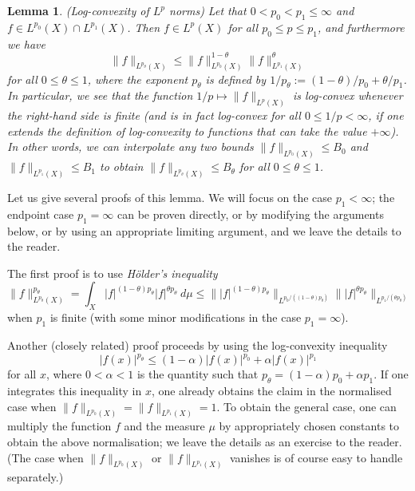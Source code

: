 \documentclass[10pt,reqno]{amsart}
\newtheorem{lemma}[theorem]{Lemma}
\begin{document}
\begin{lemma}
    (Log-convexity of $L^p$ norms) Let that $0 < p_0 < p_1 \leq \infty$ and $f \in L^{p_0}(X) \cap L^{p_1}(X)$. Then $f \in L^p(X)$ for all $p_0 \leq p \leq p_1$, and furthermore we have
    \[     \| f\|_{L^{p_\theta}(X)} \leq \|f\|_{L^{p_0}(X)}^{1-\theta} \|f\|_{L^{p_1}(X)}^{\theta}\]
    for all $0 \leq \theta \leq 1$, where the exponent $p_\theta$ is defined by $1/p_\theta := (1-\theta)/p_0 + \theta/p_1$. In particular, we see that the function $1/p \mapsto \|f\|_{L^p(X)}$ is log-convex whenever the right-hand side is finite (and is in fact log-convex for all $0 \leq 1/p < \infty$, if one extends the definition of log-convexity to functions that can take the value $+\infty$). In other words, we can interpolate any two bounds $\|f\|_{L^{p_0}(X)} \leq B_0$ and $\|f\|_{L^{p_1}(X)} \leq B_1$ to obtain $\|f\|_{L^{p_\theta}(X)} \leq B_\theta$ for all $0 \leq \theta \leq 1$.
\end{lemma}

Let us give several proofs of this lemma. We will focus on the case $p_1 < \infty$; the endpoint case $p_1=\infty$ can be proven directly, or by modifying the arguments below, or by using an appropriate limiting argument, and we leave the details to the reader.

The first proof is to use \emph{Hölder’s inequality}
%
\[ \|f\|_{L^{p_\theta}(X)}^{p_\theta} = \int_X |f|^{(1-\theta) p_\theta} |f|^{\theta p_\theta} \ d\mu \leq \| |f|^{(1-\theta) p_\theta} \|_{L^{p_0/((1-\theta) p_\theta)}} \| |f|^{\theta p_\theta} \|_{L^{p_1/(\theta p_\theta)}}\]
%
when $p_1$ is finite (with some minor modifications in the case $p_1 = \infty$).

Another (closely related) proof proceeds by using the log-convexity inequality
%
\[ |f(x)|^{p_\theta} \leq (1-\alpha) |f(x)|^{p_0} + \alpha |f(x)|^{p_1}\]
%
for all $x$, where $0 < \alpha < 1$ is the quantity such that $p_\theta = (1-\alpha) p_0 + \alpha p_1$. If one integrates this inequality in $x$, one already obtains the claim in the normalised case when $\|f\|_{L^{p_0}(X)} = \|f\|_{L^{p_1}(X)} = 1$. To obtain the general case, one can multiply the function $f$ and the measure $\mu$ by appropriately chosen constants to obtain the above normalisation; we leave the details as an exercise to the reader. (The case when $\|f\|_{L^{p_0}(X)}$ or $\|f\|_{L^{p_1}(X)}$ vanishes is of course easy to handle separately.)
\end{document}
